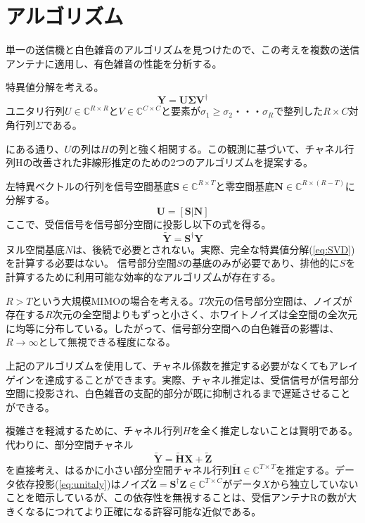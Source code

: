 \documentclass[11pt]{jsarticle}
\begin{document}
\section{アルゴリズム}
単一の送信機と白色雑音のアルゴリズムを見つけたので、この考えを複数の送信アンテナに適用し、有色雑音の性能を分析する。 

特異値分解を考える。
\begin{equation}
  \label{eq:SVD}
  \boldsymbol{Y}=\boldsymbol{U\Sigma V^{\dagger}}
\end{equation}
ユニタリ行列$U\in \mathbb{C}^{R \times R}$と$V\in \mathbb{C}^{C \times C}$と要素が$\sigma_{1}\geq\sigma_{2}・・・\sigma_{R}$で整列した$R\times C$対角行列$\Sigma$である。

\cite{ngo}にある通り、$U$の列は$H$の列と強く相関する。この観測\cite{ngo}に基づいて、チャネル行列Hの改善された非線形推定のための2つのアルゴリズムを提案する。

左特異ベクトルの行列を信号空間基底$\boldsymbol{S}\in\mathbb{C}^{R\times T}$と零空間基底$\boldsymbol{N}\in\mathbb{C}^{R\times (R-T)}$に分解する。
\begin{equation}
  \label{eq:unitaly}
  \boldsymbol{U=[S|N]}
\end{equation}
ここで、受信信号を信号部分空間に投影し以下の式を得る。
\begin{equation}
  \boldsymbol{\tilde{Y}=S^{\dagger}Y}
\end{equation}
ヌル空間基底$N$は、後続で必要とされない。実際、完全な特異値分解(\ref{eq:SVD})を計算する必要はない。 信号部分空間$S$の基底のみが必要であり、排他的に$S$を計算するために利用可能な効率的なアルゴリズムが存在する。

$R>T$という大規模MIMOの場合を考える。$T$次元の信号部分空間は、ノイズが存在する$R$次元の全空間よりもずっと小さく、ホワイトノイズは全空間の全次元に均等に分布している。したがって、信号部分空間への白色雑音の影響は、$R\to\infty$として無視できる程度になる。

上記のアルゴリズムを使用して、チャネル係数を推定する必要がなくてもアレイゲインを達成することができます。実際、チャネル推定は、受信信号が信号部分空間に投影され、白色雑音の支配的部分が既に抑制されるまで遅延させることができる。

複雑さを軽減するために、チャネル行列$H$を全く推定しないことは賢明である。 代わりに、部分空間チャネル
\begin{equation}
  \boldsymbol{\tilde{Y}=\tilde{H}X+\tilde{Z}}
\end{equation}
を直接考え、はるかに小さい部分空間チャネル行列$\boldsymbol{\tilde{H}}\in\mathbb{C}^{T\times T}$を推定する。データ依存投影(\ref{eq:unitaly})はノイズ$\boldsymbol{\tilde{Z}=S^{\dagger}Z}\in \mathbb{C}^{T\times C}$がデータ$X$から独立していないことを暗示しているが、この依存性を無視することは、受信アンテナRの数が大きくなるにつれてより正確になる許容可能な近似である。
\end{document}
